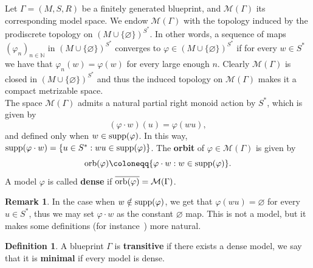 \documentclass{article}
\theoremstyle{definition}
\newtheorem{remark}[theorem]{Remark}
\newtheorem{defn}[theorem]{Definition} %
\theoremstyle{definition}
\newcommand{\N}{\mathbb{N}}
\newcommand{\M}{\mathcal{M}}
\newcommand{\orb}{\textnormal{orb}}
\newcommand{\supp}{\textnormal{supp}}
\newcommand{\define}[1]{\textbf{#1}}
\begin{document}
Let $\Gamma = (M, S, R)$ be a finitely generated blueprint, and $\M(\Gamma)$ its corresponding model space. We endow $\M(\Gamma)$ with the topology induced by the prodiscrete topology on $(M\cup \{\varnothing\})^{S^*}$. In other words, a sequence of maps $(\varphi_n)_{n \in \N}$ in $(M\cup \{\varnothing\})^{S^*}$ converges to $\varphi \in(M\cup \{\varnothing\})^{S^*}$ if for every $w \in S^*$ we have that $\varphi_n(w) = \varphi(w)$ for every large enough $n$. Clearly $\M(\Gamma)$ is closed in $(M\cup \{\varnothing\})^{S^*}$ and thus the induced topology on $\M(\Gamma)$ makes it a compact metrizable space.\\

The space $\M(\Gamma)$ admits a natural partial right monoid action by $S^*$, which is given by \[(\varphi\cdot w)(u) = \varphi(wu),\] and defined only when $w\in \supp(\varphi)$. In this way, $\supp(\varphi\cdot w) = \{u\in S^{*} : wu\in \supp(\varphi)\}$. The \define{orbit} of $\varphi \in \M(\Gamma)$ is given by
\[\orb(\varphi) \coloneqq \{\varphi\cdot w : w\in \supp(\varphi)\}.\]
A model $\varphi$ is called \define{dense} if $\overline{\orb(\varphi)} = \M(\Gamma)$.

\begin{remark}
    In the case when $w\notin \supp(\varphi)$, we get that $\varphi(wu)=\varnothing$ for every $u \in S^*$, thus we may set $\varphi \cdot w$ as the constant $\varnothing$ map. This is not a model, but it makes some definitions (for instance~) more natural.
\end{remark}

\begin{defn}
    A blueprint $\Gamma$ is \define{transitive} if there exists a dense model, we say that it is \define{minimal} if every model is dense.
\end{defn} 
\end{document}
